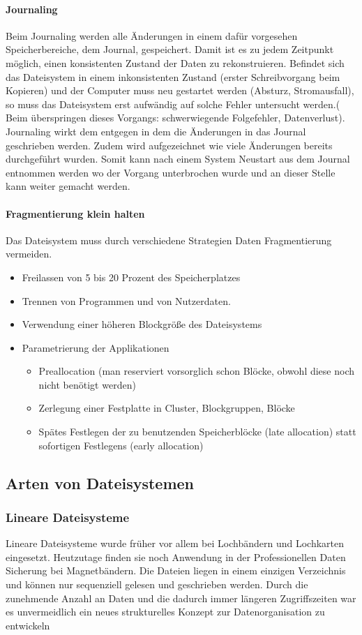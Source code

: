 \paragraph{Journaling}
Beim Journaling werden alle Änderungen in einem dafür vorgesehen Speicherbereiche, dem Journal, gespeichert. Damit ist es zu jedem Zeitpunkt möglich, einen konsistenten Zustand der Daten zu rekonstruieren. Befindet sich das Dateisystem in einem inkonsistenten Zustand (erster Schreibvorgang beim Kopieren) und der Computer muss neu gestartet werden (Absturz, Stromausfall), so muss das Dateisystem erst aufwändig auf solche Fehler untersucht werden.( Beim überspringen dieses Vorgangs: schwerwiegende Folgefehler, Datenverlust). \\[3mm]
Journaling wirkt dem entgegen in dem die Änderungen in das Journal geschrieben werden. Zudem wird aufgezeichnet wie viele Änderungen bereits durchgeführt wurden. Somit kann nach einem System Neustart aus dem Journal entnommen werden wo der Vorgang unterbrochen wurde und an dieser Stelle kann weiter gemacht werden.
\paragraph{Fragmentierung klein halten}
Das Dateisystem muss durch verschiedene Strategien Daten Fragmentierung vermeiden.
\begin{itemize}
	\item Freilassen von 5 bis 20 Prozent des Speicherplatzes
	\item Trennen von Programmen und von Nutzerdaten.
	\item Verwendung einer höheren Blockgröße des Dateisystems
	\item Parametrierung der Applikationen 
	\begin{itemize}
		\item Preallocation (man reserviert vorsorglich schon Blöcke, obwohl diese noch nicht benötigt werden)
		\item Zerlegung einer Festplatte in Cluster, Blockgruppen, Blöcke
		\item Spätes Festlegen der zu benutzenden Speicherblöcke (late allocation) statt sofortigen Festlegens (early allocation)
	\end{itemize}
\end{itemize}   
\subsection{Arten von Dateisystemen}
\subsubsection{Lineare Dateisysteme} Lineare Dateisysteme wurde früher vor allem bei Lochbändern und Lochkarten eingesetzt. Heutzutage finden sie noch Anwendung in der Professionellen Daten Sicherung bei Magnetbändern. Die Dateien liegen in einem einzigen Verzeichnis und können nur sequenziell gelesen und geschrieben werden. Durch die zunehmende
Anzahl an Daten und die dadurch immer längeren Zugriffszeiten war es
unvermeidlich ein neues strukturelles Konzept zur Datenorganisation zu entwickeln
